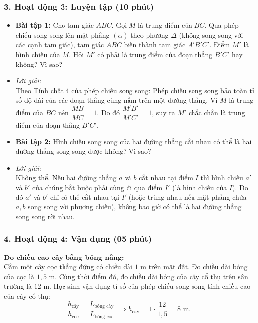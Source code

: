 \documentclass[12pt, a4paper]{article}
\begin{document}
\subsubsection*{3. Hoạt động 3: Luyện tập (10 phút)}
\begin{itemize}
    \item \textbf{Bài tập 1:} Cho tam giác $ABC$. Gọi $M$ là trung điểm của $BC$. Qua phép chiếu song song lên mặt phẳng $(\alpha)$ theo phương $\Delta$ (không song song với các cạnh tam giác), tam giác $ABC$ biến thành tam giác $A'B'C'$. Điểm $M'$ là hình chiếu của $M$. Hỏi $M'$ có phải là trung điểm của đoạn thẳng $B'C'$ hay không? Vì sao?
    \item \textit{Lời giải:}\\
    Theo Tính chất 4 của phép chiếu song song: Phép chiếu song song bảo toàn tỉ số độ dài của các đoạn thẳng cùng nằm trên một đường thẳng. Vì $M$ là trung điểm của $BC$ nên $\dfrac{MB}{MC} = 1$. Do đó $\dfrac{M'B'}{M'C'} = 1$, suy ra $M'$ chắc chắn là trung điểm của đoạn thẳng $B'C'$.
    \item \textbf{Bài tập 2:} Hình chiếu song song của hai đường thẳng cắt nhau có thể là hai đường thẳng song song được không? Vì sao?
    \item \textit{Lời giải:}\\
    Không thể. Nếu hai đường thẳng $a$ và $b$ cắt nhau tại điểm $I$ thì hình chiếu $a'$ và $b'$ của chúng bắt buộc phải cùng đi qua điểm $I'$ (là hình chiếu của $I$). Do đó $a'$ và $b'$ chỉ có thể cắt nhau tại $I'$ (hoặc trùng nhau nếu mặt phẳng chứa $a, b$ song song với phương chiếu), không bao giờ có thể là hai đường thẳng song song rời nhau.
\end{itemize}

\subsubsection*{4. Hoạt động 4: Vận dụng (05 phút)}
\textbf{Đo chiều cao cây bằng bóng nắng:}\\
Cắm một cây cọc thẳng đứng có chiều dài $1\text{ m}$ trên mặt đất. Đo chiều dài bóng của cọc là $1{,}5\text{ m}$. Cùng thời điểm đó, đo chiều dài bóng của cây cổ thụ trên sân trường là $12\text{ m}$. Học sinh vận dụng tỉ số của phép chiếu song song tính chiều cao của cây cổ thụ:
$$\dfrac{h_{\text{cây}}}{h_{\text{cọc}}} = \dfrac{L_{\text{bóng cây}}}{L_{\text{bóng cọc}}} \implies h_{\text{cây}} = 1 \cdot \dfrac{12}{1{,}5} = 8\text{ m}.$$

\newpage
\end{document}
